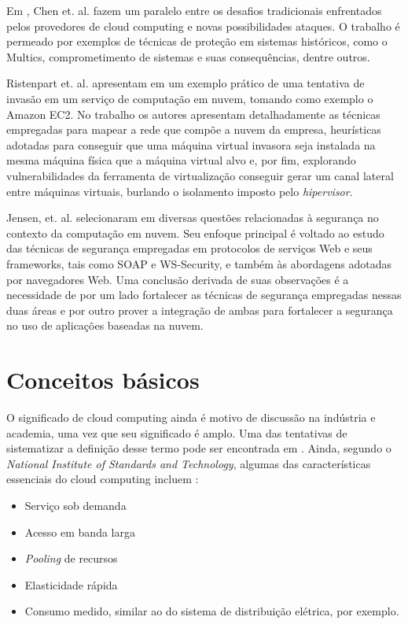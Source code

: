 \documentclass[brazil,12pt]{article}
\begin{document}
Em \cite{whats-new-about-cloud-security}, Chen et. al. fazem um paralelo entre
os desafios tradicionais enfrentados pelos provedores de cloud computing e novas
possibilidades ataques. O trabalho é permeado por exemplos de técnicas de
proteção em sistemas históricos, como o Multics, comprometimento de sistemas e
suas consequências, dentre outros.

Ristenpart et. al. apresentam em \cite{hey-you-get-off-of-my-cloud} um
exemplo prático de uma tentativa de invasão em um serviço de computação em
nuvem, tomando como exemplo o Amazon EC2. No trabalho os autores apresentam
detalhadamente as técnicas empregadas para mapear a rede que compõe a nuvem da
empresa, heurísticas adotadas para conseguir que uma máquina virtual invasora
seja instalada na mesma máquina física que a máquina virtual alvo e, por fim,
explorando vulnerabilidades da ferramenta de virtualização conseguir gerar um
canal lateral entre máquinas virtuais, burlando o isolamento imposto pelo
\emph{hipervisor}. 

Jensen, et. al. selecionaram em \cite{technical-security-issues} diversas
questões relacionadas à segurança no contexto da computação em nuvem. Seu
enfoque principal é voltado ao estudo das técnicas de segurança empregadas em
protocolos de serviços Web e seus frameworks, tais como SOAP e WS-Security, e
também às abordagens adotadas por navegadores Web. Uma conclusão derivada de
suas observações é a necessidade de por um lado fortalecer as técnicas de
segurança empregadas nessas duas áreas e por outro prover a integração de ambas
para fortalecer a segurança no uso de aplicações baseadas na nuvem.

\section{Conceitos básicos}
O significado de cloud computing ainda é motivo de discussão na indústria e
academia, uma vez que seu significado é amplo. Uma das tentativas de
sistematizar a definição desse termo pode ser encontrada em \cite{above-clouds}.
Ainda, segundo o \emph{National Institute of Standards and Technology}, algumas
das características essenciais do cloud computing incluem
\cite{nist-definition-cloud-computing}:

\begin{itemize}
  \item Serviço sob demanda
  \item Acesso em banda larga
  \item \emph{Pooling} de recursos
  \item Elasticidade rápida
  \item Consumo medido, similar ao do sistema de distribuição elétrica, por
  exemplo.
\end{itemize}
\end{document}

